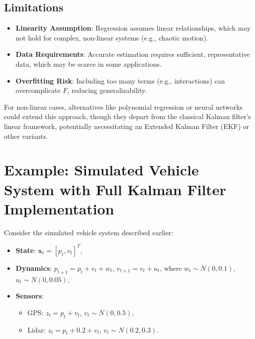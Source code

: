 \documentclass[12pt]{article}
\begin{document}
\subsection{Limitations}
\begin{itemize}
    \item \textbf{Linearity Assumption}: Regression assumes linear relationships, which may not hold for complex, non-linear systems (e.g., chaotic motion).
    \item \textbf{Data Requirements}: Accurate estimation requires sufficient, representative data, which may be scarce in some applications.
    \item \textbf{Overfitting Risk}: Including too many terms (e.g., interactions) can overcomplicate \( F \), reducing generalizability.
\end{itemize}

For non-linear cases, alternatives like polynomial regression or neural networks could extend this approach, though they depart from the classical Kalman filter’s linear framework, potentially necessitating an Extended Kalman Filter (EKF) or other variants.

\section{Example: Simulated Vehicle System with Full Kalman Filter Implementation}
\label{sec:example}

Consider the simulated vehicle system described earlier:
\begin{itemize}
    \item \textbf{State}: \( \mathbf{x}_t = [p_t, v_t]^T \),
    \item \textbf{Dynamics}: \( p_{t+1} = p_t + v_t + w_t \), \( v_{t+1} = v_t + u_t \), where \( w_t \sim N(0, 0.1) \), \( u_t \sim N(0, 0.05) \),
    \item \textbf{Sensors}:
    \begin{itemize}
        \item GPS: \( z_t = p_t + v_t \), \( v_t \sim N(0, 0.5) \),
        \item Lidar: \( z_t = p_t + 0.2 + v_t \), \( v_t \sim N(0.2, 0.3) \).
    \end{itemize}
\end{itemize}
\end{document}
